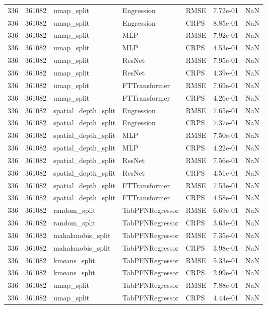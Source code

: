 \begin{tabular}{rrlllrr}
336 & 361082 & umap\_split & Engression & RMSE & 7.72e-01 & NaN \\
336 & 361082 & umap\_split & Engression & CRPS & 8.85e-01 & NaN \\
336 & 361082 & umap\_split & MLP & RMSE & 7.92e-01 & NaN \\
336 & 361082 & umap\_split & MLP & CRPS & 4.53e-01 & NaN \\
336 & 361082 & umap\_split & ResNet & RMSE & 7.95e-01 & NaN \\
336 & 361082 & umap\_split & ResNet & CRPS & 4.39e-01 & NaN \\
336 & 361082 & umap\_split & FTTransformer & RMSE & 7.69e-01 & NaN \\
336 & 361082 & umap\_split & FTTransformer & CRPS & 4.26e-01 & NaN \\
336 & 361082 & spatial\_depth\_split & Engression & RMSE & 7.65e-01 & NaN \\
336 & 361082 & spatial\_depth\_split & Engression & CRPS & 7.37e-01 & NaN \\
336 & 361082 & spatial\_depth\_split & MLP & RMSE & 7.50e-01 & NaN \\
336 & 361082 & spatial\_depth\_split & MLP & CRPS & 4.22e-01 & NaN \\
336 & 361082 & spatial\_depth\_split & ResNet & RMSE & 7.56e-01 & NaN \\
336 & 361082 & spatial\_depth\_split & ResNet & CRPS & 4.51e-01 & NaN \\
336 & 361082 & spatial\_depth\_split & FTTransformer & RMSE & 7.53e-01 & NaN \\
336 & 361082 & spatial\_depth\_split & FTTransformer & CRPS & 4.58e-01 & NaN \\
336 & 361082 & random\_split & TabPFNRegressor & RMSE & 6.69e-01 & NaN \\
336 & 361082 & random\_split & TabPFNRegressor & CRPS & 3.63e-01 & NaN \\
336 & 361082 & mahalanobis\_split & TabPFNRegressor & RMSE & 7.35e-01 & NaN \\
336 & 361082 & mahalanobis\_split & TabPFNRegressor & CRPS & 3.98e-01 & NaN \\
336 & 361082 & kmeans\_split & TabPFNRegressor & RMSE & 5.33e-01 & NaN \\
336 & 361082 & kmeans\_split & TabPFNRegressor & CRPS & 2.99e-01 & NaN \\
336 & 361082 & umap\_split & TabPFNRegressor & RMSE & 7.88e-01 & NaN \\
336 & 361082 & umap\_split & TabPFNRegressor & CRPS & 4.44e-01 & NaN \\

\end{tabular}
